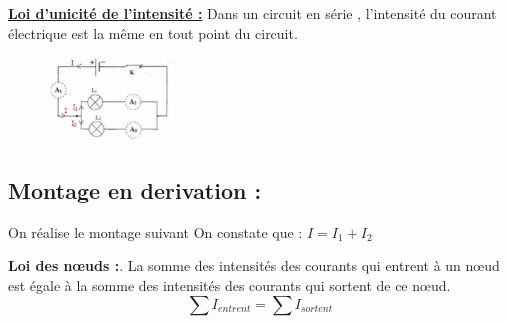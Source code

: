\documentclass[12pt]{article}
\begin{document}
\textbf{\underline{Loi d'unicité de l'intensité :}} Dans un circuit en série , l'intensité du courant électrique est la même en tout point du circuit.

\begin{figure}
\includegraphics[width=0.3\textwidth]{./img/img_06.png}
\end{figure}
\subsection{Montage en derivation :} 
On réalise le montage suivant 
On constate que : $I=I_1+I_2$


\textbf{Loi des nœuds :}. La somme des intensités des courants qui entrent à un nœud est égale à la somme des intensités des courants
qui sortent de ce nœud.
$$\sum I_{entrent} = \sum I_{sortent}$$
\end{document}
